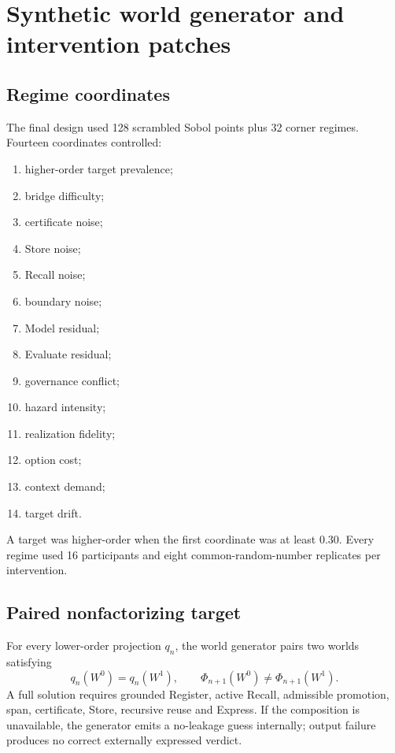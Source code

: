 \documentclass[10pt]{article}
\begin{document}
\section{Synthetic world generator and intervention patches}
\subsection{Regime coordinates}
The final design used 128 scrambled Sobol points plus 32 corner regimes. Fourteen coordinates controlled:
\begin{enumerate}
\item higher-order target prevalence;
\item bridge difficulty;
\item certificate noise;
\item Store noise;
\item Recall noise;
\item boundary noise;
\item Model residual;
\item Evaluate residual;
\item governance conflict;
\item hazard intensity;
\item realization fidelity;
\item option cost;
\item context demand;
\item target drift.
\end{enumerate}
A target was higher-order when the first coordinate was at least 0.30. Every regime used 16 participants and eight common-random-number replicates per intervention.

\subsection{Paired nonfactorizing target}
For every lower-order projection $q_n$, the world generator pairs two worlds satisfying
\begin{equation}
q_n(W^0)=q_n(W^1),\qquad \Phi_{n+1}(W^0)\neq\Phi_{n+1}(W^1).
\end{equation}
A full solution requires grounded Register, active Recall, admissible promotion, span, certificate, Store, recursive reuse and Express. If the composition is unavailable, the generator emits a no-leakage guess internally; output failure produces no correct externally expressed verdict.
\end{document}
